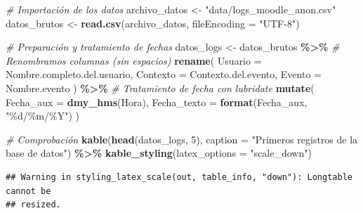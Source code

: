\documentclass[notspecified,article,submit,moreauthors,pdftex]{Definitions/mdpi}
\newenvironment{Shaded}{\begin{snugshade}}{\end{snugshade}}
\newcommand{\AttributeTok}[1]{\textcolor[rgb]{0.13,0.29,0.53}{#1}}
\newcommand{\CommentTok}[1]{\textcolor[rgb]{0.56,0.35,0.01}{\textit{#1}}}
\newcommand{\DecValTok}[1]{\textcolor[rgb]{0.00,0.00,0.81}{#1}}
\newcommand{\FunctionTok}[1]{\textcolor[rgb]{0.13,0.29,0.53}{\textbf{#1}}}
\newcommand{\NormalTok}[1]{#1}
\newcommand{\OtherTok}[1]{\textcolor[rgb]{0.56,0.35,0.01}{#1}}
\newcommand{\SpecialCharTok}[1]{\textcolor[rgb]{0.81,0.36,0.00}{\textbf{#1}}}
\newcommand{\StringTok}[1]{\textcolor[rgb]{0.31,0.60,0.02}{#1}}
\begin{document}
\begin{Shaded}
\begin{Highlighting}[]
\CommentTok{\# Importación de los datos}
\NormalTok{archivo\_datos }\OtherTok{\textless{}{-}} \StringTok{"data/logs\_moodle\_anon.csv"}
\NormalTok{datos\_brutos }\OtherTok{\textless{}{-}} \FunctionTok{read.csv}\NormalTok{(archivo\_datos, }\AttributeTok{fileEncoding =} \StringTok{"UTF{-}8"}\NormalTok{)}

\CommentTok{\# Preparación y tratamiento de fechas }
\NormalTok{datos\_logs }\OtherTok{\textless{}{-}}\NormalTok{ datos\_brutos }\SpecialCharTok{\%\textgreater{}\%}
  \CommentTok{\# Renombramos columnas (sin espacios)}
  \FunctionTok{rename}\NormalTok{(}
    \AttributeTok{Usuario =}\NormalTok{ Nombre.completo.del.usuario,}
    \AttributeTok{Contexto =}\NormalTok{ Contexto.del.evento,}
    \AttributeTok{Evento =}\NormalTok{ Nombre.evento}
\NormalTok{  ) }\SpecialCharTok{\%\textgreater{}\%}
  \CommentTok{\# Tratamiento de fecha con lubridate}
  \FunctionTok{mutate}\NormalTok{(}
    \AttributeTok{Fecha\_aux =} \FunctionTok{dmy\_hms}\NormalTok{(Hora),}
    \AttributeTok{Fecha\_texto =} \FunctionTok{format}\NormalTok{(Fecha\_aux, }\StringTok{"\%d/\%m/\%Y"}\NormalTok{)}
\NormalTok{  )}

\CommentTok{\# Comprobación }
\FunctionTok{kable}\NormalTok{(}\FunctionTok{head}\NormalTok{(datos\_logs, }\DecValTok{5}\NormalTok{), }\AttributeTok{caption =} \StringTok{"Primeros registros de la base de datos"}\NormalTok{) }\SpecialCharTok{\%\textgreater{}\%}
  \FunctionTok{kable\_styling}\NormalTok{(}\AttributeTok{latex\_options =} \StringTok{"scale\_down"}\NormalTok{)}
\end{Highlighting}
\end{Shaded}

\begin{verbatim}
## Warning in styling_latex_scale(out, table_info, "down"): Longtable cannot be
## resized.
\end{verbatim}
\end{document}
